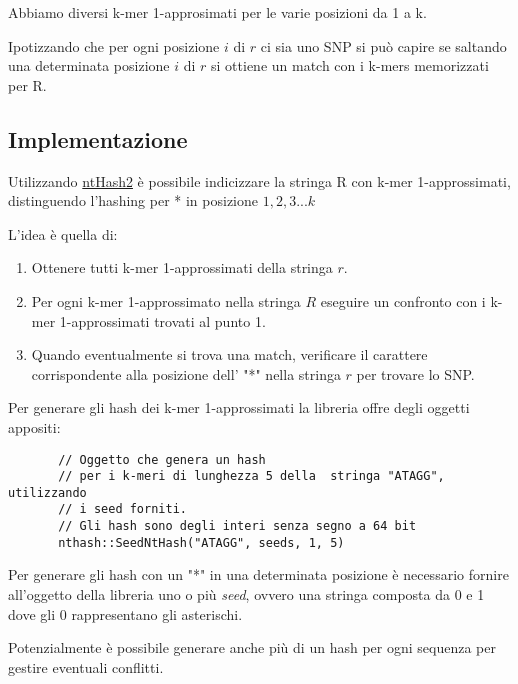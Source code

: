 \documentclass{article}
\begin{document}
Abbiamo diversi k-mer 1-approsimati per le varie posizioni da 1 a k.

Ipotizzando che per ogni posizione $i$ di $r$ ci sia uno SNP si può capire se saltando una determinata posizione $i$ di $r$ si ottiene un match con i k-mers memorizzati per R.

\subsection{Implementazione}

Utilizzando  \href{https://github.com/bcgsc/ntHash}{ntHash2} è possibile indicizzare la stringa R con k-mer 1-approssimati, distinguendo l'hashing per * in posizione $1,2,3...k$


L'idea è quella di:

\begin{enumerate} 
 \item	Ottenere tutti k-mer 1-approssimati della stringa $r$.
 \item  Per ogni k-mer 1-approssimato nella stringa $R$ eseguire un confronto con i k-mer 1-approssimati trovati al punto 1.
 \item Quando eventualmente si trova una match, verificare il carattere corrispondente alla posizione dell' "*" nella stringa $r$ per trovare lo SNP.
\end{enumerate}

Per generare gli hash dei k-mer 1-approssimati la libreria offre degli oggetti appositi:

\begin{lstlisting}
	   // Oggetto che genera un hash
	   // per i k-meri di lunghezza 5 della  stringa "ATAGG", utilizzando
	   // i seed forniti.
	   // Gli hash sono degli interi senza segno a 64 bit
	   nthash::SeedNtHash("ATAGG", seeds, 1, 5)
\end{lstlisting}

Per generare gli hash con un "*" in una determinata posizione è necessario fornire all'oggetto della libreria uno o più \textit{seed},  ovvero una stringa composta da 0 e 1 dove gli 0 rappresentano gli asterischi.

Potenzialmente è possibile generare anche più di un hash per ogni sequenza per gestire eventuali conflitti.
\end{document}
